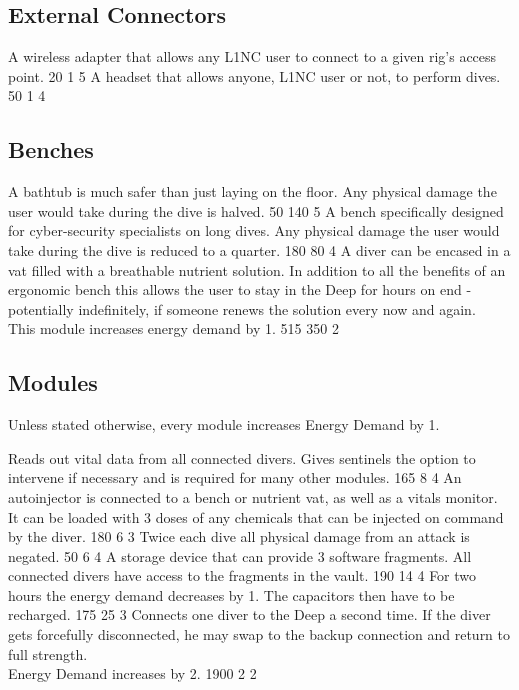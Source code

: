 \subsection{External Connectors}
	{A wireless adapter that allows any L1NC user to connect to a given rig's access point.}
	{20}
	{1}
	{5}
	{A headset that allows anyone, L1NC user or not, to perform dives.}
	{50}
	{1}
	{4}
\subsection{Benches}
	{A bathtub is much safer than just laying on the floor.
		Any physical damage the user would take during the dive is halved.
		}
	{50}
	{140}
	{5}
	{A bench specifically designed for cyber-security specialists on long dives.
		Any physical damage the user would take during the dive is reduced to a quarter.
		}
	{180}
	{80}
	{4}
	{A diver can be encased in a vat filled with a breathable nutrient solution.
		In addition to all the benefits of an ergonomic bench this allows the user to stay in the Deep for hours on end
		- potentially indefinitely, if someone renews the solution every now and again.
		\\%
		This module increases energy demand by 1.}
	{515}
	{350}
	{2}
\subsection{Modules}
\vspace{4mm}
\begin{exampleblock}
	Unless stated otherwise, every module increases Energy Demand by 1.
\end{exampleblock}
	{Reads out vital data from all connected divers.
		Gives sentinels the option to intervene if necessary and is required for many other modules.
	}
	{165}
	{8}
	{4}
	{An autoinjector is connected to a bench or nutrient vat, as well as a vitals monitor.
		It can be loaded with 3 doses of any chemicals that can be injected on command by the diver.
	}
	{180}
	{6}
	{3}
	{Twice each dive all physical damage from an attack is negated.
	}
	{50}
	{6}
	{4}
	{A storage device that can provide 3 software fragments.
		All connected divers have access to the fragments in the vault.
	}
	{190}
	{14}
	{4}
	{For two hours the energy demand decreases by 1.
		The capacitors then have to be recharged.}
	{175}
	{25}
	{3}
	{Connects one diver to the Deep a second time.
		If the diver gets forcefully disconnected, he may swap to the backup connection and return to full strength.
		\\%
		Energy Demand increases by 2.
	}
	{1900}
	{2}
	{2}

